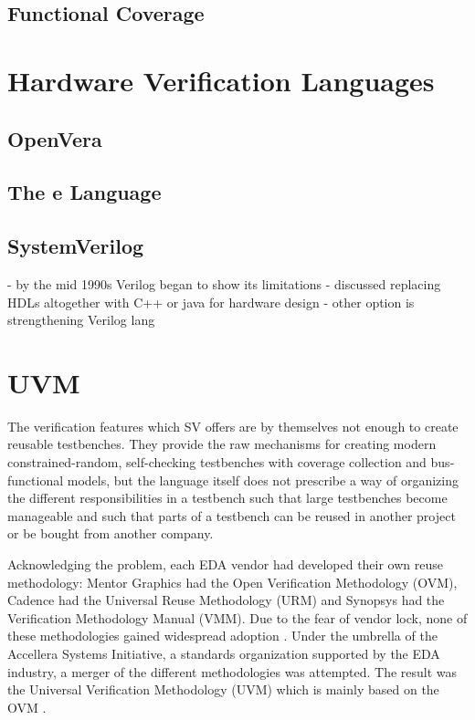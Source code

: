 \documentclass[12pt]{book}
\begin{document}
\subsection{Functional Coverage}

\section{Hardware Verification Languages} %

\subsection{OpenVera}

\cite[Sec. 7, pp. 51-??]{flake2020a}

\subsection{The e Language}

\subsection{SystemVerilog}

\cite[Sec. 6, pp. 43]{flake2020a}
- by the mid 1990s Verilog began to show its limitations
- discussed replacing HDLs altogether with C++ or java for hardware design
- other option is strengthening Verilog lang

\section{UVM} %

The verification features which SV offers are by themselves not enough to create reusable testbenches. They provide
the raw mechanisms for creating modern constrained-random, self-checking testbenches with coverage collection and
bus-functional models, but the language itself does not prescribe a way of organizing the different responsibilities
in a testbench such that large testbenches become manageable and such that parts of a testbench can be reused in
another project or be bought from another company.

Acknowledging the problem, each EDA vendor had developed their own reuse methodology: Mentor Graphics had the Open
Verification Methodology (OVM), Cadence had the Universal Reuse Methodology (URM) and Synopsys had the Verification
Methodology Manual (VMM). Due to the fear of vendor lock, none of these methodologies gained widespread adoption
\cite[ch. 4]{mehta2018asic}. Under the umbrella of the Accellera Systems Initiative, a standards organization
supported by the EDA industry, a merger of the different methodologies was attempted. The result was the Universal
Verification Methodology (UVM) which is mainly based on the OVM \cite[ch. 4]{mehta2018asic}.
\end{document}
